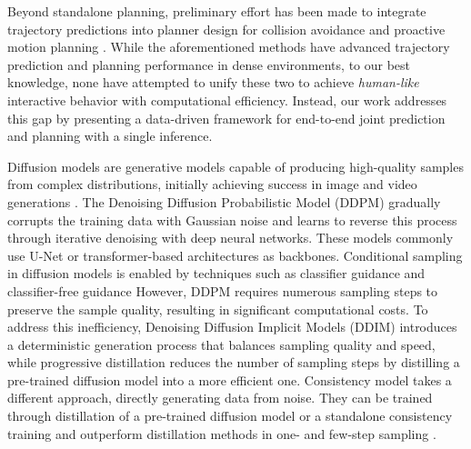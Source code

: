 Beyond standalone planning, preliminary effort has been made to integrate trajectory predictions into planner design for collision avoidance \citep{li2021prediction} and proactive motion planning \cite{bae2022lane, saxena2020driving, song2024efficient}. 
While the aforementioned methods have advanced trajectory prediction and planning performance in dense environments, to our best knowledge, none
have attempted to unify these two to achieve \textit{human-like} interactive behavior with computational efficiency. 
Instead, our work addresses this gap by presenting a data-driven framework for end-to-end joint prediction and planning with a single inference.

Diffusion models \citep{sohl2015deep,song2020score,ho2020denoising} are generative models capable of producing high-quality samples from complex distributions, initially achieving success in image and video generations \citep{rombach2022high,ho2022video}.
The Denoising Diffusion Probabilistic Model (DDPM) \citep{ho2020denoising} gradually corrupts the training data with Gaussian noise and learns to reverse this process through iterative denoising with deep neural networks.
These models commonly use U-Net \citep{ronneberger2015u} or transformer-based architectures \citep{vaswani2017attention} as backbones.
Conditional sampling in diffusion models is enabled by techniques such as classifier guidance \citep{dhariwal2021diffusion} and classifier-free guidance \citep{ho2022classifier}
However, DDPM requires numerous sampling steps to preserve the sample quality, resulting in significant computational costs.
To address this inefficiency, Denoising Diffusion Implicit Models (DDIM) \citep{song2020denoising} introduces a deterministic generation process that balances sampling quality and speed, while progressive distillation \citep{salimans2022progressive} reduces the number of sampling steps by distilling a pre-trained diffusion model into a more efficient one.
Consistency model \citep{song2023consistency,song2023improved} takes a different approach, directly generating
data from noise.
They can be trained through distillation of a pre-trained diffusion model or a standalone consistency training and outperform distillation methods in one- and few-step sampling \citep{song2023consistency}.

